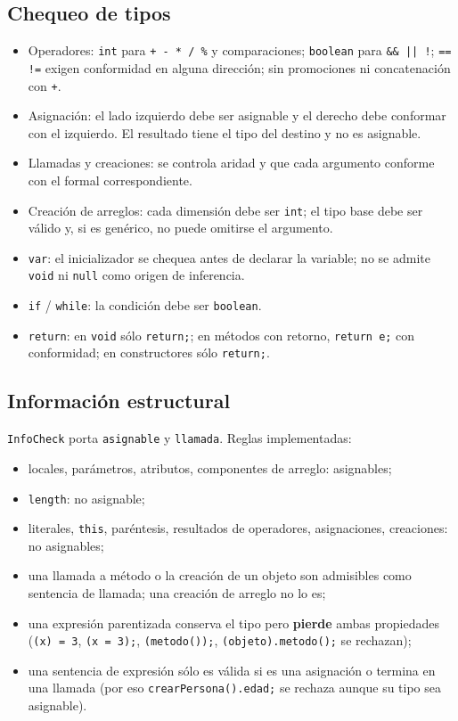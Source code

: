 \documentclass[11pt,a4paper]{article}
\begin{document}
\subsection{Chequeo de tipos}

\begin{itemize}
  \item Operadores: \texttt{int} para \texttt{+ - * / \%} y comparaciones;
        \texttt{boolean} para \texttt{\&\& || !}; \texttt{== !=} exigen
        conformidad en alguna dirección; sin promociones ni concatenación con
        \texttt{+}.
  \item Asignación: el lado izquierdo debe ser asignable y el derecho debe
        conformar con el izquierdo. El resultado tiene el tipo del destino y no es
        asignable.
  \item Llamadas y creaciones: se controla aridad y que cada argumento conforme
        con el formal correspondiente.
  \item Creación de arreglos: cada dimensión debe ser \texttt{int}; el tipo base
        debe ser válido y, si es genérico, no puede omitirse el argumento.
  \item \texttt{var}: el inicializador se chequea antes de declarar la variable;
        no se admite \texttt{void} ni \texttt{null} como origen de inferencia.
  \item \texttt{if} / \texttt{while}: la condición debe ser \texttt{boolean}.
  \item \texttt{return}: en \texttt{void} sólo \texttt{return;}; en métodos con
        retorno, \texttt{return e;} con conformidad; en constructores sólo
        \texttt{return;}.
\end{itemize}

\subsection{Información estructural}

\texttt{InfoCheck} porta \texttt{asignable} y \texttt{llamada}. Reglas
implementadas:

\begin{itemize}
  \item locales, parámetros, atributos, componentes de arreglo: asignables;
  \item \texttt{length}: no asignable;
  \item literales, \texttt{this}, paréntesis, resultados de operadores,
        asignaciones, creaciones: no asignables;
  \item una llamada a método o la creación de un objeto son admisibles como
        sentencia de llamada; una creación de arreglo no lo es;
  \item una expresión parentizada conserva el tipo pero \textbf{pierde} ambas
        propiedades (\texttt{(x) = 3}, \texttt{(x = 3);}, \texttt{(metodo());},
        \texttt{(objeto).metodo();} se rechazan);
  \item una sentencia de expresión sólo es válida si es una asignación o termina
        en una llamada (por eso \texttt{crearPersona().edad;} se rechaza aunque su
        tipo sea asignable).
\end{itemize}
\end{document}

